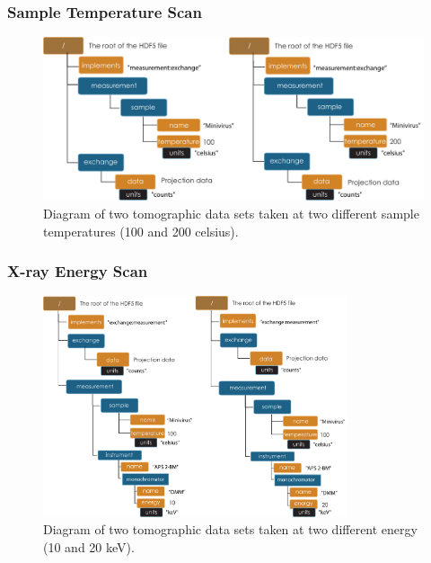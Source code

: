 \subsubsection{Sample Temperature Scan}
\begin{figure}[h!]
\centering
\includegraphics[width=1.0\textwidth]{figures/dx_MinimalTomo2.pdf}
\caption{Diagram of two tomographic data sets taken at two different sample temperatures (100 and 200 celsius).}
\label{fig:MinimalTomo2}
\end{figure}

\clearpage
\subsubsection{X-ray Energy Scan}
\begin{figure}[h!]
\centering
\includegraphics[width=0.8\textwidth]{figures/dx_MinimalTomo3.pdf}
\caption{Diagram of two tomographic data sets taken at two different energy (10 and 20 keV).}
\label{fig:MinimalTomo3}
\end{figure}

\clearpage
